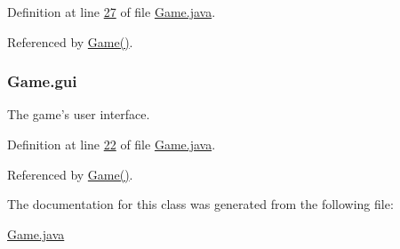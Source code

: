 Definition at line \hyperlink{Game_8java_source_l00027}{27} of file \hyperlink{Game_8java_source}{Game.\-java}.



Referenced by \hyperlink{Game_8java_source_l00032}{Game()}.

\hypertarget{classGame_a9003da90b15756c7975d03db874632a4}{
\subsubsection[{gui}]{ Game.\-gui\hspace{0.3cm}{\ttfamily [private]}}}\label{classGame_a9003da90b15756c7975d03db874632a4}


The game's user interface. 



Definition at line \hyperlink{Game_8java_source_l00022}{22} of file \hyperlink{Game_8java_source}{Game.\-java}.



Referenced by \hyperlink{Game_8java_source_l00032}{Game()}.



The documentation for this class was generated from the following file\-:\begin{DoxyCompactItemize}
\item 
\hyperlink{Game_8java}{Game.\-java}\end{DoxyCompactItemize}
